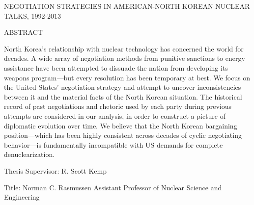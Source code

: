% 
% 
%

\begin{center}
NEGOTIATION STRATEGIES IN AMERICAN-NORTH KOREAN NUCLEAR TALKS, 1992-2013

{}

{}

{}
\end{center}

\begin{flushleft}ABSTRACT

North Korea's relationship with nuclear technology has concerned the world for decades. A wide array of negotiation methods from punitive sanctions to energy assistance have been attempted to dissuade the nation from developing its weapons program---but every resolution has been temporary at best. We focus on the United States' negotiation strategy and attempt to uncover inconsistencies between it and the material facts of the North Korean situation. The historical record of past negotiations and rhetoric used by each party during previous attempts are considered in our analysis, in order to construct a picture of diplomatic evolution over time. We believe that the North Korean bargaining position---which has been highly consistent across decades of cyclic negotiating behavior---is fundamentally incompatible with US demands for complete denuclearization.

\vfill

Thesis Supervisor: R. Scott Kemp

Title: Norman C. Rasmussen Assistant Professor of Nuclear Science and Engineering\end{flushleft}

